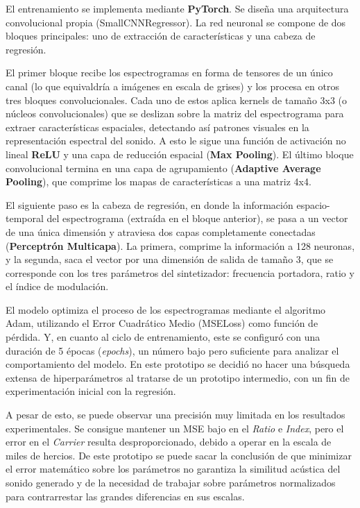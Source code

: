 El entrenamiento se implementa mediante \textbf{PyTorch}. Se diseña una arquitectura convolucional 
propia (SmallCNNRegressor). La red neuronal se compone de dos bloques principales:
uno de extracción de características y una cabeza de regresión. 

El primer bloque recibe los espectrogramas en forma de tensores de un único canal (lo que equivaldría a 
imágenes en escala de grises) y los procesa en otros tres bloques convolucionales. Cada uno de estos aplica
kernels de tamaño 3x3 (o núcleos convolucionales) que se deslizan sobre la matriz del espectrograma
para extraer características espaciales, detectando así patrones visuales en la representación espectral del sonido.
A esto le sigue una función de activación no lineal \textbf{ReLU} y una capa de reducción espacial (\textbf{Max Pooling}). 
El último bloque convolucional termina en una capa de agrupamiento (\textbf{Adaptive Average Pooling}), que comprime los
mapas de características a una matriz 4x4.

El siguiente paso es la cabeza de regresión, en donde la información espacio-temporal del espectrograma
(extraída en el bloque anterior), se pasa a un vector de una única dimensión y atraviesa dos capas
completamente conectadas (\textbf{Perceptrón Multicapa}). La primera, comprime la información a 128 neuronas,
y la segunda, saca el vector por una dimensión de salida de tamaño 3, que se corresponde con los tres parámetros
del sintetizador: frecuencia portadora, ratio y el índice de modulación.

El modelo optimiza el proceso de los espectrogramas mediante el algoritmo Adam, utilizando el Error Cuadrático
Medio (MSELoss) como función de pérdida. Y, en cuanto al ciclo de entrenamiento, este se configuró con 
una duración de 5 épocas (\textit{epochs}), un número bajo pero suficiente para analizar el comportamiento del modelo. En este prototipo se decidió no hacer una búsqueda extensa
de hiperparámetros al tratarse de un prototipo intermedio, con un fin de experimentación inicial 
con la regresión.

A pesar de esto, se puede observar una precisión muy limitada en los resultados experimentales.
Se consigue mantener un MSE bajo en el \textit{Ratio} e \textit{Index}, pero el error en el
\textit{Carrier} resulta desproporcionado, debido a operar en la escala de miles de hercios. 
De este prototipo se puede sacar la conclusión de que minimizar el error matemático sobre los
parámetros no garantiza la similitud acústica del sonido generado y de la necesidad de trabajar sobre parámetros normalizados para contrarrestar las grandes diferencias en sus escalas. 


